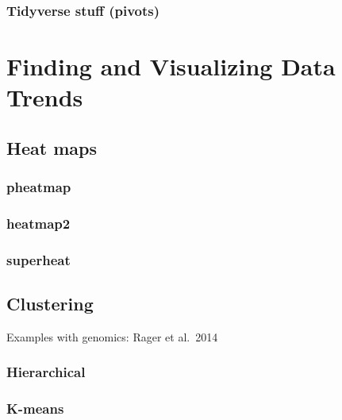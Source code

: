 \documentclass[
]{book}
\begin{document}
\hypertarget{tidyverse-stuff-pivots}{%
\subsection{Tidyverse stuff (pivots)}\label{tidyverse-stuff-pivots}}

\hypertarget{finding-and-visualizing-data-trends}{%
\chapter{Finding and Visualizing Data Trends}\label{finding-and-visualizing-data-trends}}

\hypertarget{heat-maps}{%
\section{Heat maps}\label{heat-maps}}

\hypertarget{pheatmap}{%
\subsection{pheatmap}\label{pheatmap}}

\hypertarget{heatmap2}{%
\subsection{heatmap2}\label{heatmap2}}

\hypertarget{superheat}{%
\subsection{superheat}\label{superheat}}

\hypertarget{clustering}{%
\section{Clustering}\label{clustering}}

Examples with genomics: Rager et al.~2014

\hypertarget{hierarchical}{%
\subsection{Hierarchical}\label{hierarchical}}

\hypertarget{k-means}{%
\subsection{K-means}\label{k-means}}
\end{document}

